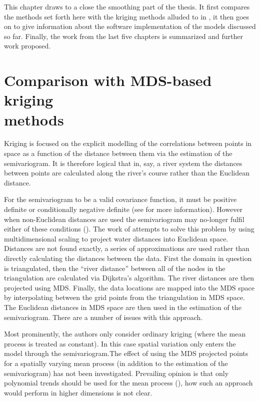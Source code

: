 \label{chap-fasend}

This chapter draws to a close the smoothing part of the thesis. It first compares the methods set forth here with the kriging methods alluded to in , it then goes on to give information about the software implementation of the models discussed so far. Finally, the work from the last five chapters is summarized and further work proposed.

\section{Comparison with MDS-based kriging\\methods}
\label{gds-krig}

Kriging is focused on the explicit modelling of the correlations between points in space as a function of the distance between them via the estimation of the semivariogram. It is therefore logical that in, say, a river system the distances between points are calculated along the river's course rather than the Euclidean distance. 

For the semivariogram to be a valid covariance function, it must be positive definite or conditionally negative definite (see  for more information\label{cor-6s1}). However when non-Euclidean distances are used the semivariogram may no-longer fulfil either of these conditions (\cite{curriero}). The work of  attempts to solve this problem by using multidimensional scaling to project water distances into Euclidean space. Distances are not found exactly, a series of approximations are used rather than directly calculating the distances between the data. First the domain in question is triangulated, then the ``river distance'' between all of the nodes in the triangulation are calculated via Dijkstra's algorithm. The river distances are then projected using MDS. Finally, the data locations are mapped into the MDS space by interpolating between the grid points from the triangulation in MDS space.  The Euclidean distances in MDS space are then used in the estimation of the semivariogram. There are a number of issues with this approach. 

Most prominently, the authors only consider ordinary kriging (where the mean process is treated as constant). In this case spatial variation only enters the model through the semivariogram.The effect of using the MDS projected points for a spatially varying mean process (in addition to the estimation of the semivariogram) has not been investigated. Prevailing opinion is that only polynomial trends should be used for the mean process (\cite[p. 57]{diggle}), how such an approach would perform in higher dimensions is not clear.

